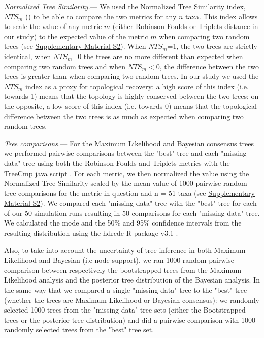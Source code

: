 \documentclass[12pt,letterpaper]{article}
\renewcommand{\subsubsection}[1]{%
\vspace{2ex}
\noindent
\textit{#1.}---}
\begin{document}
\subsubsection{Normalized Tree Similarity}
We used the Normalized Tree Similarity index, $NTS_m$ (\citealp{Bogdanowicz2012}) to be able to compare the two metrics for any $n$ taxa. This index allows to scale the value of any metric $m$ (either Robinson-Foulds or Triplets distance in our study) to the expected value of the metric $m$ when comparing two random trees (see \hyperref[SupplementaryMaterial]{Supplementary Material S2}). When $NTS_m$=1, the two trees are strictly identical, when $NTS_m$=0 the trees are no more different than expected when comparing two random trees and when $NTS_m$$<$0, the difference between the two trees is greater than when comparing two random trees. In our study we used the $NTS_m$ index as a proxy for topological recovery: a high score of this index (i.e. towards 1) means that the topology is highly conserved between the two trees; on the opposite, a low score of this index (i.e. towards 0) means that the topological difference between the two trees is as much as expected when comparing two random trees.

\subsubsection{Tree comparisons}
For the Maximum Likelihood and Bayesian consensus trees we performed pairwise comparisons between the "best" tree and each "missing-data" tree using both the Robinson-Foulds and Triplets metrics with the TreeCmp java script \citep{Bogdanowicz2012}. For each metric, we then normalized the value using the Normalized Tree Similarity scaled by the mean value of 1000 pairwise random tree comparisons for the metric in question and n = 51 taxa (see \hyperref[SupplementaryMaterial]{Supplementary Material S2}). %
We compared each "missing-data" tree with the "best" tree for each of our 50 simulation runs resulting in 50 comparisons for each "missing-data" tree. We calculated the mode and the 50\% and 95\% confidence intervals from the resulting distribution using the hdrcde R package v3.1 \citep{hdrcde}.

Also, to take into account the uncertainty of tree inference in both Maximum Likelihood and Bayesian (i.e node support), we ran 1000 random pairwise comparison between respectively the bootstrapped trees from the Maximum Likelihood analysis and the posterior tree distribution of the Bayesian analysis. In the same way that we compared a single "missing-data" tree to the "best" tree (whether the trees are Maximum Likelihood or Bayesian consensus): we randomly selected 1000 trees from the "missing-data" tree sets (either the Bootstrapped trees or the posterior tree distribution) and did a pairwise comparison with 1000 randomly selected trees from the "best" tree set.
\end{document}
